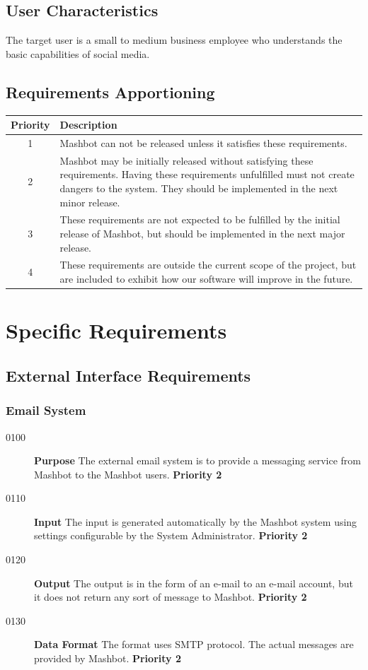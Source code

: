 \documentclass{article}
\begin{document}
\subsection{User Characteristics} %
The target user is a small to medium business employee who understands
the basic capabilities of social media.

\subsection{Requirements Apportioning} %
\begin{tabular}{|c|p{4in}|}
  \hline \textbf{Priority} & \textbf{Description} \\ \hline \hline 1 &
  Mashbot can not be released unless it satisfies these
  requirements. \\ \hline 2 & Mashbot may be initially released
  without satisfying these requirements. Having these requirements
  unfulfilled must not create dangers to the system. They should be
  implemented in the next minor release. \\ \hline 3 & These
  requirements are not expected to be fulfilled by the initial release
  of Mashbot, but should be implemented in the next major
  release. \\ \hline 4 & These requirements are outside the current
  scope of the project, but are included to exhibit how our software
  will improve in the future. \\ \hline
\end{tabular}

\section{Specific Requirements}
\subsection{External Interface Requirements} %
\subsubsection{Email System}
\begin{description}
\item[0100] \textbf{Purpose} The external email system is to provide a
  messaging service from Mashbot to the Mashbot
  users. \textbf{Priority 2}
\item[0110] \textbf{Input} The input is generated automatically by the
  Mashbot system using settings configurable by the System
  Administrator. \textbf{Priority 2}
\item[0120] \textbf{Output} The output is in the form of an e-mail to an
  e-mail account, but it does not return any sort of message to
  Mashbot. \textbf{Priority 2}
\item[0130] \textbf{Data Format} The format uses SMTP protocol. The actual
  messages are provided by Mashbot. \textbf{Priority 2}
\end{description}
\end{document}
